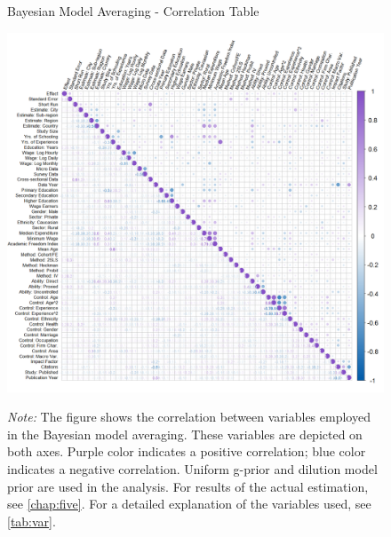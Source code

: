 \begin{figure}[!htbp]
\begin{center}
\caption{Bayesian Model Averaging - Correlation Table}
\label{fig:bma_corr}
\includegraphics[width=1\textwidth]{Figures/bma_corrplot.png}
\end{center}\vspace{-0.5cm}
\captionsetup{width=0.9\textwidth, font = scriptsize}
\caption*{\emph{Note:} The figure shows the correlation between variables employed in the Bayesian model averaging. These variables are depicted on both axes. Purple color indicates a positive correlation; blue color indicates a negative correlation. Uniform g-prior and dilution model prior are used in the analysis. For results of the actual estimation, see \autoref{chap:five}. For a detailed explanation of the variables used, see \autoref{tab:var}.
}
\end{figure}



